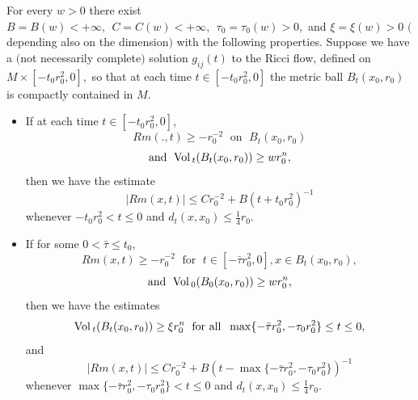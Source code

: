 \begin{theorem}
  \label{thm:cz-local-volume-growth-curvature-estimate}

For every $w>0$ there exist $B=B(w)<+\infty,\ \ C=C(w)<+\infty, \
\ \tau_0=\tau_0(w)>0,$ and $\xi=\xi(w)>0$ $($depending also on the
dimension$)$ with the following properties. Suppose we have a
$($not necessarily complete$)$ solution $g_{ij}(t)$ to the Ricci
flow, defined on $M\times[-t_0r_0^2,0],$ so that at each time
$t\in [-t_0r_0^2,0]$ the metric ball $B_t(x_0,r_0)$ is compactly
contained in $M.$
\begin{itemize}
\item[(i)] If at each time $t \in [-t_0r_0^2,0]$,
$$
Rm(.,t)\geq -r_0^{-2} \; \mbox{ on }\; B_t(x_0,r_0)
$$
$$
\mbox{and } \; {\rm Vol}\,_t(B_t(x_0,r_0))\geq wr_0^n,
$$
then we have the estimate
$$
|Rm(x,t)|\leq Cr_0^{-2}+B(t+t_0r_0^2)^{-1}
$$
whenever $-t_0r_0^2 < t\leq 0$ and $d_t(x,x_0)\leq
\frac{1}{4}r_0.$ \item[(ii)] If for some $0 < \bar{\tau} \leq
t_0$,
$$
Rm(x,t)\geq -r_0^{-2} \; \mbox{ for }\; t\in [-\bar{\tau}
r_0^2,0], x\in B_t(x_0,r_0),
$$
$$
\mbox{and } \; {\rm Vol}\,_0(B_0(x_0,r_0))\geq wr_0^n,
$$
then we have the estimates
$$
{\rm Vol}\,_t(B_t(x_0,r_0))\geq \xi r_0^n\; \mbox{ for all }\;
\max\{-\bar{\tau}r_0^2,-\tau_0r_0^2\}   \leq t \leq 0,
$$
and
$$
|Rm(x,t)|\leq Cr_0^{-2}+B(t -\max\{-\bar{\tau}r_0^2,-\tau_0r_0^2\}
)^{-1}
$$
whenever $\max\{-\bar{\tau}r_0^2,-\tau_0r_0^2\} < t\leq 0$ and
$d_t(x,x_0)\leq \frac{1}{4}r_0.$
\end{itemize}
\end{theorem}

